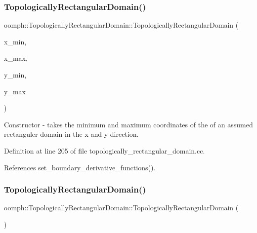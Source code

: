 \subsubsection{\texorpdfstring{Topologically\+Rectangular\+Domain()}{TopologicallyRectangularDomain()}\hspace{0.1cm}{\footnotesize\ttfamily [3/4]}}
{\footnotesize\ttfamily oomph\+::\+Topologically\+Rectangular\+Domain\+::\+Topologically\+Rectangular\+Domain (\begin{DoxyParamCaption}\item[{const double \&}]{x\+\_\+min,  }\item[{const double \&}]{x\+\_\+max,  }\item[{const double \&}]{y\+\_\+min,  }\item[{const double \&}]{y\+\_\+max }\end{DoxyParamCaption})}



Constructor -\/ takes the minimum and maximum coordinates of the of an assumed rectanguler domain in the x and y direction. 



Definition at line 205 of file topologically\+\_\+rectangular\+\_\+domain.\+cc.



References set\+\_\+boundary\+\_\+derivative\+\_\+functions().

\mbox{\label{classoomph_1_1TopologicallyRectangularDomain_a31181fa9d4032d7a1f3aa93fa011b85c}} 
\subsubsection{\texorpdfstring{Topologically\+Rectangular\+Domain()}{TopologicallyRectangularDomain()}\hspace{0.1cm}{\footnotesize\ttfamily [4/4]}}
{\footnotesize\ttfamily oomph\+::\+Topologically\+Rectangular\+Domain\+::\+Topologically\+Rectangular\+Domain (\begin{DoxyParamCaption}\item[{const \hyperlink{classoomph_1_1TopologicallyRectangularDomain}{Topologically\+Rectangular\+Domain} \&}]{ }\end{DoxyParamCaption})\hspace{0.3cm}{\ttfamily [inline]}}



